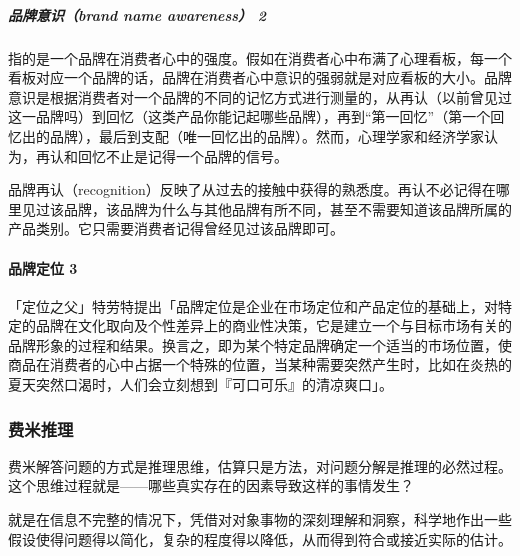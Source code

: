 \documentclass[letterpaper,11pt,english]{sphinxmanual}
\begin{document}
\subparagraph{品牌意识（brand name awareness） 2\sphinxfootnotemark[328]}
\label{\detokenize{chapter_idea/brand:brand-name-awareness-2}}%
\begin{footnotetext}[328]\sphinxAtStartFootnote
{}
%
\end{footnotetext}\ignorespaces 
指的是一个品牌在消费者心中的强度。假如在消费者心中布满了心理看板，每一个看板对应一个品牌的话，品牌在消费者心中意识的强弱就是对应看板的大小。品牌意识是根据消费者对一个品牌的不同的记忆方式进行测量的，从再认（以前曾见过这一品牌吗）到回忆（这类产品你能记起哪些品牌），再到“第一回忆”（第一个回忆出的品牌），最后到支配（唯一回忆出的品牌）。然而，心理学家和经济学家认为，再认和回忆不止是记得一个品牌的信号。

品牌再认（recognition）反映了从过去的接触中获得的熟悉度。再认不必记得在哪里见过该品牌，该品牌为什么与其他品牌有所不同，甚至不需要知道该品牌所属的产品类别。它只需要消费者记得曾经见过该品牌即可。


\paragraph{品牌定位 3\sphinxfootnotemark[329]}
\label{\detokenize{chapter_idea/brand:id7}}%
\begin{footnotetext}[329]\sphinxAtStartFootnote
{}
%
\end{footnotetext}\ignorespaces 
「定位之父」特劳特提出「品牌定位是企业在市场定位和产品定位的基础上，对特定的品牌在文化取向及个性差异上的商业性决策，它是建立一个与目标市场有关的品牌形象的过程和结果。换言之，即为某个特定品牌确定一个适当的市场位置，使商品在消费者的心中占据一个特殊的位置，当某种需要突然产生时，比如在炎热的夏天突然口渴时，人们会立刻想到『可口可乐』的清凉爽口」。


\subsubsection{费米推理}
\label{\detokenize{chapter_idea/decompose:id1}}\label{\detokenize{chapter_idea/decompose::doc}}
费米解答问题的方式是推理思维，估算只是方法，对问题分解是推理的必然过程。这个思维过程就是——哪些真实存在的因素导致这样的事情发生？

就是在信息不完整的情况下，凭借对对象事物的深刻理解和洞察，科学地作出一些假设使得问题得以简化，复杂的程度得以降低，从而得到符合或接近实际的估计。
\end{document}
